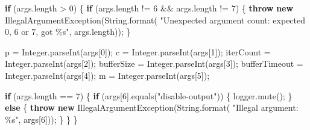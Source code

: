 \documentclass[11pt]{article}
\newenvironment{Shaded}{}{}
\newcommand{\KeywordTok}[1]{\textcolor[rgb]{0.00,0.44,0.13}{\textbf{{#1}}}}
\newcommand{\DecValTok}[1]{\textcolor[rgb]{0.25,0.63,0.44}{{#1}}}
\newcommand{\StringTok}[1]{\textcolor[rgb]{0.25,0.44,0.63}{{#1}}}
\newcommand{\FunctionTok}[1]{\textcolor[rgb]{0.02,0.16,0.49}{{#1}}}
\newcommand{\NormalTok}[1]{{#1}}
\newcommand{\SpecialCharTok}[1]{\textcolor[rgb]{0.25,0.44,0.63}{{#1}}}
\newcommand{\ControlFlowTok}[1]{\textcolor[rgb]{0.00,0.44,0.13}{\textbf{{#1}}}}
\newcommand{\OperatorTok}[1]{\textcolor[rgb]{0.40,0.40,0.40}{{#1}}}
\newcommand{\BuiltInTok}[1]{{#1}}
\begin{document}
\begin{Shaded}
\begin{Highlighting}[]
        \ControlFlowTok{if} \OperatorTok{(}\NormalTok{args}\OperatorTok{.}\FunctionTok{length} \OperatorTok{\textgreater{}} \DecValTok{0}\OperatorTok{)} \OperatorTok{\{}
            \ControlFlowTok{if} \OperatorTok{(}\NormalTok{args}\OperatorTok{.}\FunctionTok{length} \OperatorTok{!=} \DecValTok{6} \OperatorTok{\&\&}\NormalTok{ args}\OperatorTok{.}\FunctionTok{length} \OperatorTok{!=} \DecValTok{7}\OperatorTok{)} \OperatorTok{\{}
                \ControlFlowTok{throw} \KeywordTok{new} \BuiltInTok{IllegalArgumentException}\OperatorTok{(}\BuiltInTok{String}\OperatorTok{.}\FunctionTok{format}\OperatorTok{(}
                    \StringTok{"Unexpected argument count: expected 0, 6 or 7, got }\SpecialCharTok{\%s}\StringTok{"}\OperatorTok{,}\NormalTok{ args}\OperatorTok{.}\FunctionTok{length}\OperatorTok{));}
            \OperatorTok{\}}

\NormalTok{            p }\OperatorTok{=} \BuiltInTok{Integer}\OperatorTok{.}\FunctionTok{parseInt}\OperatorTok{(}\NormalTok{args}\OperatorTok{[}\DecValTok{0}\OperatorTok{]);}
\NormalTok{            c }\OperatorTok{=} \BuiltInTok{Integer}\OperatorTok{.}\FunctionTok{parseInt}\OperatorTok{(}\NormalTok{args}\OperatorTok{[}\DecValTok{1}\OperatorTok{]);}
\NormalTok{            iterCount }\OperatorTok{=} \BuiltInTok{Integer}\OperatorTok{.}\FunctionTok{parseInt}\OperatorTok{(}\NormalTok{args}\OperatorTok{[}\DecValTok{2}\OperatorTok{]);}
\NormalTok{            bufferSize }\OperatorTok{=} \BuiltInTok{Integer}\OperatorTok{.}\FunctionTok{parseInt}\OperatorTok{(}\NormalTok{args}\OperatorTok{[}\DecValTok{3}\OperatorTok{]);}
\NormalTok{            bufferTimeout }\OperatorTok{=} \BuiltInTok{Integer}\OperatorTok{.}\FunctionTok{parseInt}\OperatorTok{(}\NormalTok{args}\OperatorTok{[}\DecValTok{4}\OperatorTok{]);}
\NormalTok{            m }\OperatorTok{=} \BuiltInTok{Integer}\OperatorTok{.}\FunctionTok{parseInt}\OperatorTok{(}\NormalTok{args}\OperatorTok{[}\DecValTok{5}\OperatorTok{]);}

            \ControlFlowTok{if} \OperatorTok{(}\NormalTok{args}\OperatorTok{.}\FunctionTok{length} \OperatorTok{==} \DecValTok{7}\OperatorTok{)} \OperatorTok{\{}
                \ControlFlowTok{if} \OperatorTok{(}\NormalTok{args}\OperatorTok{[}\DecValTok{6}\OperatorTok{].}\FunctionTok{equals}\OperatorTok{(}\StringTok{"disable{-}output"}\OperatorTok{))} \OperatorTok{\{}
\NormalTok{                    logger}\OperatorTok{.}\FunctionTok{mute}\OperatorTok{();}
                \OperatorTok{\}} \ControlFlowTok{else} \OperatorTok{\{}
                    \ControlFlowTok{throw} \KeywordTok{new} \BuiltInTok{IllegalArgumentException}\OperatorTok{(}\BuiltInTok{String}\OperatorTok{.}\FunctionTok{format}\OperatorTok{(}
                        \StringTok{"Illegal argument: \textquotesingle{}}\SpecialCharTok{\%s}\StringTok{\textquotesingle{}"}\OperatorTok{,}\NormalTok{ args}\OperatorTok{[}\DecValTok{6}\OperatorTok{]));}
                \OperatorTok{\}}
            \OperatorTok{\}}
        \OperatorTok{\}}


\end{Highlighting}
\end{Shaded}
\end{document}
